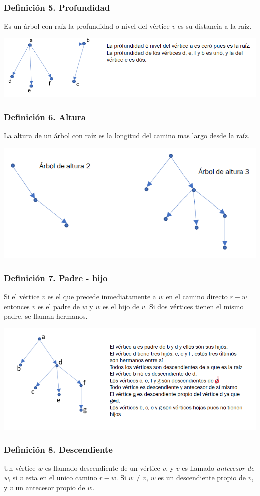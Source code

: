 \documentclass{article}
\begin{document}
\subsubsection*{Definición 5. Profundidad}
Es un árbol con raíz la profundidad o nivel del vértice $v$ es su distancia a la raíz.
\begin{center}
    \includegraphics[width=.60\textwidth]{profundidadArbol.PNG}
\end{center}

\subsubsection*{Definición 6. Altura}
La altura de un árbol con raíz es la longitud del camino mas largo desde la raíz.
\begin{center}
    \includegraphics[width=.60\textwidth]{alturaArbol.PNG}
\end{center}

\subsubsection*{Definición 7. Padre - hijo}
Si el vértice $v$ es el que precede inmediatamente a $w$ en el camino directo $r - w$ entonces
$v$ es el padre de $w$ y $w$ es el hijo de $v$. Si dos vértices tienen el mismo padre, se llaman
hermanos.
\begin{center}
    \includegraphics[width=.60\textwidth]{padreHijo.PNG}
\end{center}

\subsubsection*{Definición 8. Descendiente}
Un vértice $w$ es llamado descendiente de un vértice $v$, y $v$ es llamado \emph{antecesor de w}, si
$v$ esta en el unico camino $r - w$. Si $w \neq v$, $w$ es un descendiente propio de $v$, y $v$ un
antecesor propio de $w$.
\end{document}
